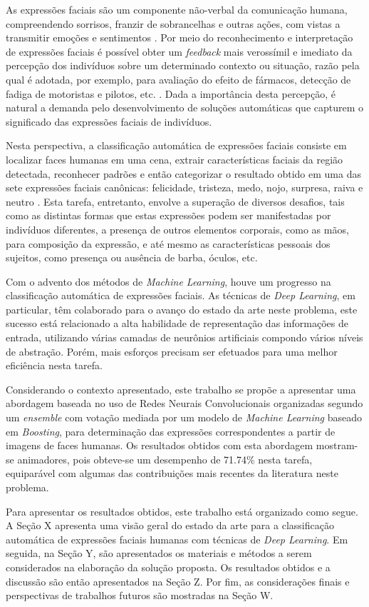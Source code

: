 As expressões faciais são um componente não-verbal da comunicação humana, compreendendo sorrisos, franzir de sobrancelhas e outras ações, com vistas a transmitir emoções e sentimentos \cite{Ekman1971}. Por meio do reconhecimento e interpretação de expressões faciais é possível obter um \emph{feedback} mais verossímil e imediato da percepção dos indivíduos sobre um determinado contexto ou situação, razão pela qual é adotada, por exemplo, para avaliação do efeito de fármacos, detecção de fadiga de motoristas e pilotos, etc. \cite{Fasel2003}. Dada a importância desta percepção, é natural a demanda pelo desenvolvimento de soluções automáticas que capturem o significado das expressões faciais de indivíduos.

Nesta perspectiva, a classificação automática de expressões faciais consiste em localizar faces humanas em uma cena, extrair características faciais da região detectada, reconhecer padrões e então categorizar o resultado obtido em uma das sete expressões faciais canônicas: felicidade, tristeza, medo, nojo, surpresa, raiva e neutro \cite{Pantic2009fea}. Esta tarefa, entretanto, envolve a superação de diversos desafios, tais como as distintas formas que estas expressões podem ser manifestadas por indivíduos diferentes, a presença de outros elementos corporais, como as mãos, para composição da expressão, e até mesmo as características pessoais dos sujeitos, como presença ou ausência de barba, óculos, etc.

Com o advento dos métodos de \emph{Machine Learning}, houve um progresso na classificação automática de expressões faciais. As técnicas de \emph{Deep Learning}, em particular, têm colaborado para o avanço do estado da arte neste problema, este sucesso está relacionado a alta habilidade de representação das informações de entrada, utilizando várias camadas de neurônios artificiais compondo vários níveis de abstração\cite{lecun2015deep}. Porém, mais esforços precisam ser efetuados para uma melhor eficiência nesta tarefa.

Considerando o contexto apresentado, este trabalho se propõe a apresentar uma abordagem baseada no uso de Redes Neurais Convolucionais organizadas segundo um \emph{ensemble} com votação mediada por um modelo de \emph{Machine Learning} baseado em \emph{Boosting}, para determinação das expressões correspondentes a partir de imagens de faces humanas. Os resultados obtidos com esta abordagem mostram-se animadores, pois obteve-se um desempenho de 71.74\% nesta tarefa, equiparável com algumas das contribuições mais recentes da literatura neste problema.

Para apresentar os resultados obtidos, este trabalho está organizado como segue. A Seção X apresenta uma visão geral do estado da arte para a classificação automática de expressões faciais humanas com técnicas de \emph{Deep Learning}. Em seguida, na Seção Y, são apresentados os materiais e métodos a serem considerados na elaboração da solução proposta. Os resultados obtidos e a discussão são então apresentados na Seção Z. Por fim, as considerações finais e perspectivas de trabalhos futuros são mostradas na Seção W. 

